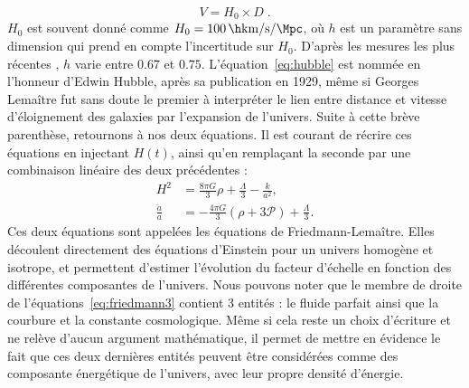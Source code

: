 \documentclass[11pt, twoside, a4paper, openright]{report}
\begin{document}
\begin{equation}
  \label{eq:hubble}
  V = H_0 \times D  \; .
\end{equation}
$H_0$ est souvent donné comme $H_{0} = \SI{100}{\h\km\per\s\per\Mpc}$, où $h$ est un paramètre sans dimension qui prend en compte l'incertitude sur $H_0$. D'après les mesures les plus récentes \autocite{Collaboration2018,Riess2019}, $h$ varie entre $\num{0,67}$ et $\num{0,75}$.
L'équation~\ref{eq:hubble} est nommée en l'honneur d'Edwin Hubble, après sa publication en 1929, même si Georges Lemaître fut sans doute le premier à interpréter le lien entre distance et vitesse d'éloignement des galaxies par l'expansion de l'univers.
Suite à cette brève parenthèse, retournons à nos deux équations. Il est courant de récrire ces équations en injectant $H(t)$, ainsi qu'en remplaçant la seconde par une combinaison linéaire des deux précédentes :
\begin{align}
  \label{eq:friedmann3}
  H^2 &= \frac{8 \pi G}{3} \rho + \frac{\Lambda}{3} - \frac{k}{a^2} ,\\
  \label{eq:friedmann4}
  \frac{\ddot{a}}{a} &= - \frac{4 \pi G}{3} (\rho + 3 \mathcal{P}) + \frac{\Lambda}{3} .
\end{align}
Ces deux équations sont appelées les équations de Friedmann-Lemaître. Elles découlent directement des équations d'Einstein pour un univers homogène et isotrope,
et permettent d'estimer l'évolution du facteur d'échelle en fonction des différentes composantes de l'univers.
Nous pouvons noter que le membre de droite de l'équations~\ref{eq:friedmann3} contient 3 entités : le fluide parfait ainsi que la courbure et la constante cosmologique. Même si cela reste un choix d'écriture et ne relève d'aucun argument mathématique, il permet de mettre en évidence le fait que ces deux dernières entités peuvent être considérées comme des composante énergétique de l'univers, avec leur propre densité d'énergie.
\end{document}
